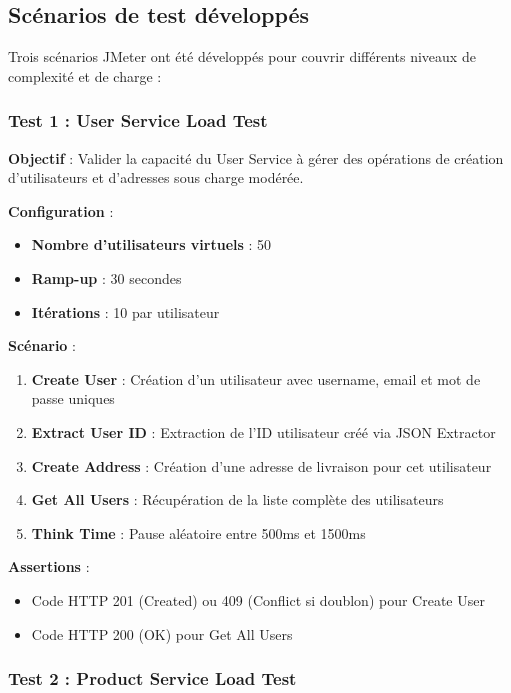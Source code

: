 \subsection{Scénarios de test développés}

Trois scénarios JMeter ont été développés pour couvrir différents niveaux de complexité et de charge :

\subsubsection{Test 1 : User Service Load Test}

\textbf{Objectif} : Valider la capacité du User Service à gérer des opérations de création d'utilisateurs et d'adresses sous charge modérée.

\textbf{Configuration} :
\begin{itemize}
    \item \textbf{Nombre d'utilisateurs virtuels} : 50
    \item \textbf{Ramp-up} : 30 secondes
    \item \textbf{Itérations} : 10 par utilisateur
\end{itemize}

\textbf{Scénario} :
\begin{enumerate}
    \item \textbf{Create User} : Création d'un utilisateur avec username, email et mot de passe uniques
    \item \textbf{Extract User ID} : Extraction de l'ID utilisateur créé via JSON Extractor
    \item \textbf{Create Address} : Création d'une adresse de livraison pour cet utilisateur
    \item \textbf{Get All Users} : Récupération de la liste complète des utilisateurs
    \item \textbf{Think Time} : Pause aléatoire entre 500ms et 1500ms
\end{enumerate}

\textbf{Assertions} :
\begin{itemize}
    \item Code HTTP 201 (Created) ou 409 (Conflict si doublon) pour Create User
    \item Code HTTP 200 (OK) pour Get All Users
\end{itemize}

\subsubsection{Test 2 : Product Service Load Test}

